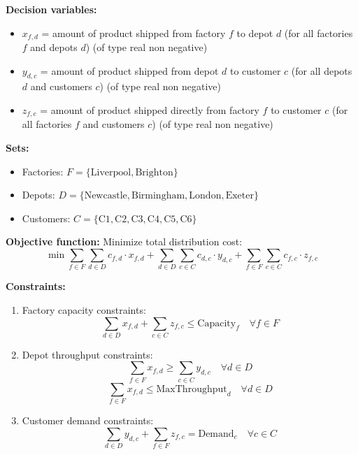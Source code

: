 \documentclass[a4paper,10pt]{article}
\begin{document}
\textbf{Decision variables:}
\begin{itemize}
  \item \(x_{f,d}\) = amount of product shipped from factory \(f\) to depot \(d\) (for all factories \(f\) and depots \(d\)) (of type real non negative)
  \item \(y_{d,c}\) = amount of product shipped from depot \(d\) to customer \(c\) (for all depots \(d\) and customers \(c\)) (of type real non negative)
  \item \(z_{f,c}\) = amount of product shipped directly from factory \(f\) to customer \(c\) (for all factories \(f\) and customers \(c\)) (of type real non negative) 
\end{itemize}

\textbf{Sets:}
\begin{itemize}
  \item Factories: \(F = \{\text{Liverpool}, \text{Brighton}\}\)
  \item Depots: \(D = \{\text{Newcastle}, \text{Birmingham}, \text{London}, \text{Exeter}\}\)
  \item Customers: \(C = \{\text{C1}, \text{C2}, \text{C3}, \text{C4}, \text{C5}, \text{C6}\}\)
\end{itemize}

\textbf{Objective function:}
Minimize total distribution cost:
\[
  \min \sum_{f \in F} \sum_{d \in D} c_{f,d} \cdot x_{f,d} + \sum_{d \in D} \sum_{c \in C} c_{d,c} \cdot y_{d,c} + \sum_{f \in F} \sum_{c \in C} c_{f,c} \cdot z_{f,c}      
\]

\textbf{Constraints:}
\begin{enumerate}
  \item Factory capacity constraints:
  \[\boxed{\sum_{d \in D} x_{f,d} + \sum_{c \in C} z_{f,c} \leq \text{Capacity}_f \quad \forall f \in F}\]

  \item Depot throughput constraints:
  \[\boxed{\sum_{f \in F} x_{f,d} \geq \sum_{c \in C} y_{d,c} \quad \forall d \in D}\]
  \[\boxed{\sum_{f \in F} x_{f,d} \leq \text{MaxThroughput}_d \quad \forall d \in D}\]

  \item Customer demand constraints:
  \[\boxed{\sum_{d \in D} y_{d,c} + \sum_{f \in F} z_{f,c} = \text{Demand}_c \quad \forall c \in C}\]

\end{enumerate}
\end{document}
